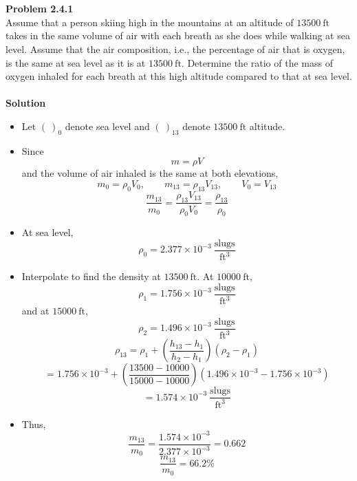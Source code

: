 ﻿\documentclass[12pt]{article}
\begin{document}
\section*{}
\textbf{Problem 2.4.1}\\
Assume that a person skiing high in the mountains at an altitude of $13500\ \mathrm{ft}$ takes in the same volume of air with each breath as she does while walking at sea level. Assume that the air composition, i.e., the percentage of air that is oxygen, is the same at sea level as it is at $13500\ \mathrm{ft}$. Determine the ratio of the mass of oxygen inhaled for each breath at this high altitude compared to that at sea level.\\\\
\textbf{Solution}
\begin{itemize}
\item Let $(\ )_0$ denote sea level and $(\ )_{13}$ denote $13500\ \mathrm{ft}$ altitude.
\item Since
\[
m=\rho V
\]
and the volume of air inhaled is the same at both elevations,
\[
m_0=\rho_0V_0,\qquad m_{13}=\rho_{13}V_{13},\qquad V_0=V_{13}
\]
\[
\frac{m_{13}}{m_0}
=\frac{\rho_{13}V_{13}}{\rho_0V_0}
=\frac{\rho_{13}}{\rho_0}
\]
\item At sea level,
\[
\rho_0=2.377\times10^{-3}\ \frac{\mathrm{slugs}}{\mathrm{ft^3}}
\]
\item Interpolate to find the density at $13500\ \mathrm{ft}$. At $10000\ \mathrm{ft}$,
\[
\rho_1=1.756\times10^{-3}\ \frac{\mathrm{slugs}}{\mathrm{ft^3}}
\]
and at $15000\ \mathrm{ft}$,
\[
\rho_2=1.496\times10^{-3}\ \frac{\mathrm{slugs}}{\mathrm{ft^3}}
\]
\[
\rho_{13}
=\rho_1+\left(\frac{h_{13}-h_1}{h_2-h_1}\right)(\rho_2-\rho_1)
\]
\[
=1.756\times10^{-3}
+\left(\frac{13500-10000}{15000-10000}\right)
\left(1.496\times10^{-3}-1.756\times10^{-3}\right)
\]
\[
=1.574\times10^{-3}\ \frac{\mathrm{slugs}}{\mathrm{ft^3}}
\]
\item Thus,
\[
\frac{m_{13}}{m_0}
=\frac{1.574\times10^{-3}}{2.377\times10^{-3}}
=0.662
\]
\[
\boxed{\frac{m_{13}}{m_0}=66.2\%}
\]
\end{itemize}
\end{document}
